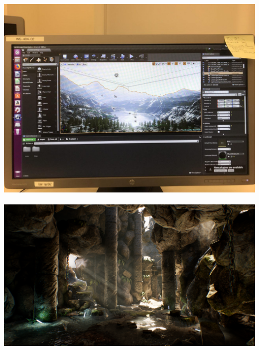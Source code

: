 \documentclass[t]{beamer}
\begin{document}
\begin{frame}
	\includegraphics[scale=0.1]{images/landscape.jpg} $\quad$
	\includegraphics[scale=0.1]{images/cave.png}
\end{frame}
\end{document}
